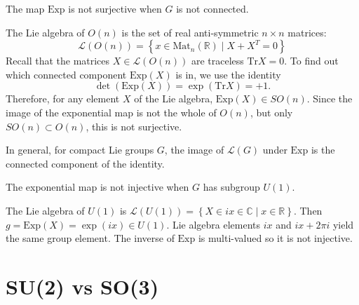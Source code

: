 \begin{claim}
  The map $\text{Exp}$ is not surjective when $G$ is not connected.
\end{claim}
\begin{example}[$G= O(n)$]
  The Lie algebra of $O(n)$ is the set of real anti-symmetric $n \times n$ matrices:
  \begin{equation}
    \mathscr{L}(O(n)) = \left\{ x \in \text{Mat}_n(\mathbb{R}) \mid X + X^T = 0 \right\}
  \end{equation}
  Recall that the matrices $X \in \mathscr{L}(O(n))$ are traceless $\text{Tr} X = 0$.
  To find out which connected component $\text{Exp}(X)$ is in, we use the identity
  \begin{equation}
    \det(\text{Exp}(X)) = \exp(\text{Tr}X) = +1.
  \end{equation}
  Therefore, for any element $X$ of the Lie algebra, $\text{Exp}(X) \in SO(n)$. Since the image of the exponential map is not the whole of $O(n)$, but only $SO(n) \subset O(n)$, this is not surjective.
\end{example}
\begin{claim}
  In general, for compact Lie groups $G$, the image of $\mathscr{L}(G)$ under $\text{Exp}$ is the connected component of the identity.
\end{claim}
\begin{claim}
  The exponential map is not injective when $G$ has subgroup $U(1)$.
\end{claim}
\begin{example}[$G = U(1)$]
  The Lie algebra of $U(1)$ is $\mathscr{L}(U(1)) = \left\{ X \in ix \in \mathbb{C} \mid x \in \mathbb{R} \right\}$. Then $g = \text{Exp}(X) = \exp(ix) \in U(1)$. Lie algebra elements $ix$ and $ix + 2 \pi i$ yield the same group element.
  The inverse of $\text{Exp}$ is multi-valued so it is not injective.
\end{example}

\section{SU(2) vs SO(3)}%
\label{sec:su_2_vs_so_3_}


